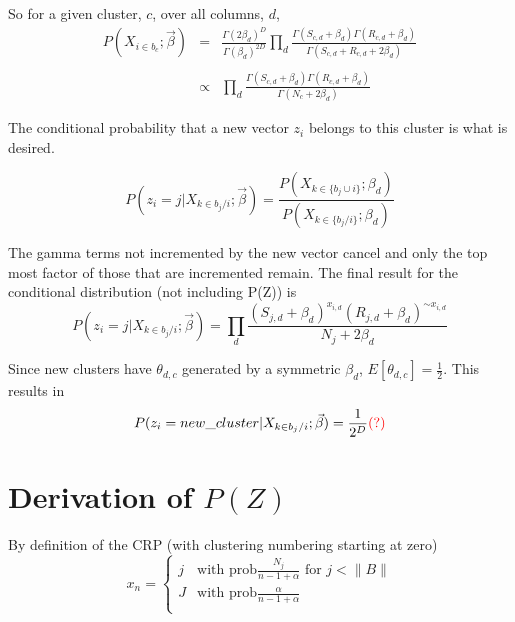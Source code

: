 \documentclass{article}
\begin{document}
So for a given cluster, $c$, over all columns, $d$,
\begin{equation}
\begin{matrix}
P(X_{i \in b_c};\vec \beta) & = & \frac{\Gamma(2\beta_d)^D}{\Gamma(\beta_d)^{2D}} \prod_d \frac{\Gamma(S_{c,d} + \beta_d)\Gamma(R_{c,d} + \beta_d)}{\Gamma(S_{c,d} + R_{c,d} + 2 \beta_d)}
\\
\\ & \propto & \prod_d \frac{\Gamma(S_{c,d} + \beta_d)\Gamma(R_{c,d} + \beta_d)}{\Gamma(N_c + 2 \beta_d)}
\end{matrix}
\end{equation}

The conditional probability that a new vector $z_i$ belongs to this cluster is what is desired.

\begin{equation}
P( z_i=j | X_{k \in b_j/i} ; \vec \beta) = \frac{P(X_{k \in \{b_j \cup i\} } ; \beta_d)}{P(X_{k \in \{b_j / i\}} ; \beta_d)}
\end{equation}

The gamma terms not incremented by the new vector cancel and only the top most factor of those that are incremented remain.  The final result for the conditional distribution (not including P(Z)) is
\begin{equation}
P( z_i=j | X_{k \in b_j/i} ; \vec \beta) = \prod_d \frac{(S_{j,d} + \beta_d)^{x_{i,d}}(R_{j,d} + \beta_d)^{\sim x_{i,d}}}{N_j + 2 \beta_d}
\end{equation}

Since new clusters have $\theta_{d,c}$ generated by a symmetric $\beta_d$, $E[\theta_{d,c}] = \frac{1}{2}$.  This results in
\begin{equation}
P( z_i=new\_cluster | X_{k \in b_j/i} ; \vec \beta) = \frac{1}{2^D} \text{\textcolor{red}{(?)}}
\end{equation}

\section{Derivation of $P(Z)$}

By definition of the CRP (with clustering numbering starting at zero)
\begin{equation}\
x_n = \begin{cases}
  j & \text{with prob} \frac{N_j}{n-1+\alpha} \text{ for $j < \|B\|$} \\
  J & \text{with prob} \frac{\alpha}{n-1+\alpha} \\
\end{cases}
\end{equation}
\end{document}

